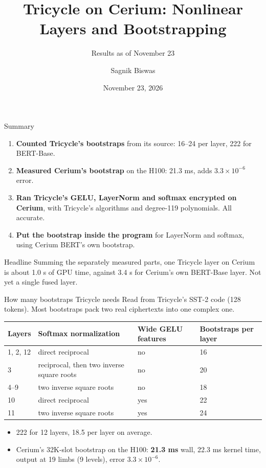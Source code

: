\documentclass[aspectratio=169]{beamer}
\title{Tricycle on Cerium: Nonlinear Layers and Bootstrapping}
\subtitle{Results as of November 23}
\author{Sagnik Biswas}
\date{November 23, 2026}
\begin{document}
\begin{frame}
  \titlepage
\end{frame}

\begin{frame}{Summary}
\small
\begin{enumerate}\small
  \item \textbf{Counted Tricycle's bootstraps} from its source: 16--24 per layer, 222 for BERT-Base.
  \item \textbf{Measured Cerium's bootstrap} on the H100: 21.3 ms, adds $3.3\times10^{-6}$ error.
  \item \textbf{Ran Tricycle's GELU, LayerNorm and softmax encrypted on Cerium}, with Tricycle's algorithms and degree-119 polynomials. All accurate.
  \item \textbf{Put the bootstrap inside the program} for LayerNorm and softmax, using Cerium BERT's own bootstrap.
\end{enumerate}
\vspace{0.6em}
\begin{block}{Headline}
Summing the separately measured parts, one Tricycle layer on Cerium is about 1.0 s of GPU time, against 3.4 s for Cerium's own BERT-Base layer. Not yet a single fused layer.
\end{block}
\end{frame}

\begin{frame}{How many bootstraps Tricycle needs}
\small
Read from Tricycle's SST-2 code (128 tokens). Most bootstraps pack two real ciphertexts into one complex one.
\begin{center}\footnotesize
\begin{tabular}{@{}llll@{}}
\toprule
\textbf{Layers} & \textbf{Softmax normalization} & \textbf{Wide GELU features} & \textbf{Bootstraps per layer}\\
\midrule
1, 2, 12 & direct reciprocal & no & 16\\
3 & reciprocal, then two inverse square roots & no & 20\\
4--9 & two inverse square roots & no & 18\\
10 & direct reciprocal & yes & 22\\
11 & two inverse square roots & yes & 24\\
\bottomrule
\end{tabular}
\end{center}
\begin{itemize}\small
  \item 222 for 12 layers, 18.5 per layer on average.
  \item Cerium's 32K-slot bootstrap on the H100: \textbf{21.3 ms} wall, 22.3 ms kernel time, output at 19 limbs (9 levels), error $3.3\times10^{-6}$.
\end{itemize}
\end{frame}
\end{document}

